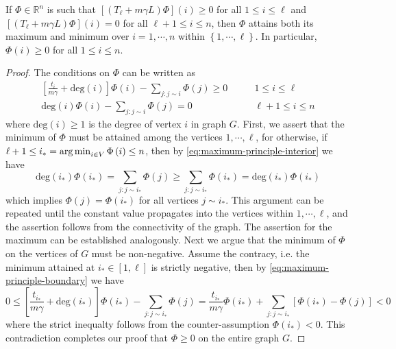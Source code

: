 \documentclass[letterpaper]{article} %
\begin{document}
\begin{lemma}
  \label{lem:maximum-principle}
  If $\Phi\in\mathbb{R}^n$ is such that $\left[\left( T_{\ell}+m\gamma L \right)\Phi\right] \left(i\right)\geq 0$ for all $1\leq i\leq \ell$ and $\left[\left( T_{\ell}+m\gamma L \right)\Phi\right] \left(i\right)=0$ for all $\ell+1\leq i\leq n$, then $\Phi$ attains both its maximum and minimum over $i=1,\cdots,n$ within $\left\{ 1,\cdots,\ell \right\}$. In particular, $\Phi\left(i\right)\geq 0$ for all $1\leq i\leq n$.
\end{lemma}
\begin{proof}
  The conditions on $\Phi$ can be written as
  \begin{align}
      \left[\frac{t_i}{m\gamma}+\mathrm{deg}\left(i\right)\right]\Phi \left( i \right)-\sum_{j:j\sim i}\Phi \left( j \right)\geq 0 & \qquad 1\leq i\leq \ell\label{eq:maximum-principle-boundary}\\
      \mathrm{deg}\left(i\right)\Phi \left( i \right)-\sum_{j:j\sim i}\Phi \left( j \right)=0 & \qquad \ell+1\leq i\leq n\label{eq:maximum-principle-interior}
  \end{align}
  where $\mathrm{deg}\left( i \right)\geq 1$ is the degree of vertex $i$ in graph $G$. First, we assert that the minimum of $\Phi$ must be attained among the vertices $1,\cdots,\ell$, for otherwise, if $\ell+1\leq i_*=\mathop{\rm arg\, min}_{i\in V}\Phi \left( i \right)\leq n$, then by \eqref{eq:maximum-principle-interior} we have
  \begin{equation*}
    \mathrm{deg}\left(i_*\right)\Phi \left( i_* \right)=\sum_{j:j\sim i_*}\Phi \left( j \right)\geq \sum_{j:j\sim i_*}\Phi \left( i_* \right)=\mathrm{deg}\left(i_*\right)\Phi \left( i_* \right)
  \end{equation*}
which implies $\Phi \left( j \right)=\Phi \left( i_* \right)$ for all vertices $j\sim i_*$. This argument can be repeated until the constant value propagates into the vertices within $1,\cdots,\ell$, and the assertion follows from the connectivity of the graph. The assertion for the maximum can be established analogously. Next we argue that the minimum of $\Phi$ on the vertices of $G$ must be non-negative. Assume the contracy, i.e. the minimum attained at $i_*\in \left[ 1,\ell \right]$ is strictly negative, then by \eqref{eq:maximum-principle-boundary} we have
  \begin{equation*}
    0\leq \left[\frac{t_{i_*}}{m\gamma}+\mathrm{deg}\left(i_{*}\right)\right]\Phi \left( i_{*} \right)-\sum_{j:j\sim i_{*}}\Phi \left( j \right)=\frac{t_{i_*}}{m\gamma}\Phi \left( i_* \right)+\sum_{j:j\sim i_*}\left[ \Phi \left( i_* \right)-\Phi \left( j \right) \right]<0
  \end{equation*}
  where the strict inequalty follows from the counter-assumption $\Phi \left( i_{*} \right)<0$. This contradiction completes our proof that $\Phi \geq 0$ on the entire graph $G$.
\end{proof}
\end{document}
